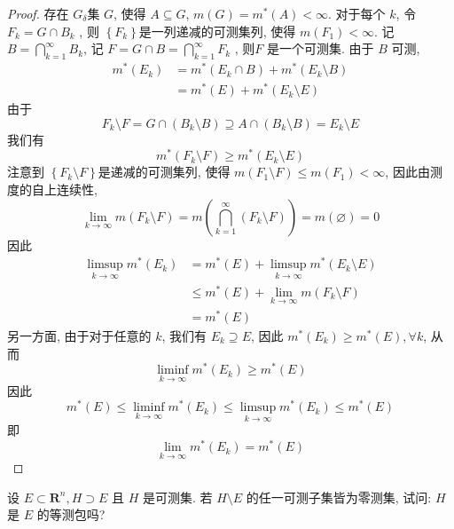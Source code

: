 \documentclass[../main.tex]{subfiles}
\begin{document}
\begin{proof}
存在 \(  G_{ \delta }  \)集 \(  G  \), 使得 \(  A\subseteq G  \), \(  m\left( G \right)= m^{*}\left( A \right)< \infty   \). 对于每个 \(  k  \), 令\(  F_{k}= G\cap B_{k}  \) , 则 \(  \left\{ F_{k} \right\}  \)是一列递减的可测集列, 使得 \(  m\left( F_1 \right)< \infty   \).     记 \(  B= \bigcap _{k= 1}^{\infty}B_{k}  \), 记 \(  F= G\cap B= \bigcap _{k= 1}^{\infty}F_{k}  \) , 则\(  F  \) 是一个可测集.   由于 \(    B\)  可测,    \[
\begin{aligned}
m^{*}\left( E_{k} \right)&= m^{*}\left( E_{k}\cap B \right)+ m^{*}\left( E_{k}\setminus B \right) \\ 
 &= m^{*}\left( E \right)+ m^{*}\left( E_{k}\setminus E \right)  
\end{aligned}   
\] 由于 \[
F_{k}\setminus F= G\cap \left( B_{k}\setminus B \right)\supseteq A\cap \left( B_{k}\setminus B \right)=  E_{k}\setminus E  
\]我们有\[m^{*}\left( F_{k}\setminus F \right)\ge m^{*}\left( E_{k}\setminus E \right)  
\]注意到 \(  \left\{ F_{k}\setminus F \right\}  \)是递减的可测集列, 使得 \(  m\left( F_1\setminus F \right)\le m\left( F_1 \right)< \infty    \),  因此由测度的自上连续性,  \[
\lim_{k\to \infty}m\left( F_{k}\setminus F \right)= m\left( \bigcap _{k= 1}^{\infty}\left( F_{k}\setminus F \right)  \right)= m\left( \varnothing \right)= 0   
\] 因此 \[\begin{aligned}
\limsup_{k\to \infty}m^{*}\left( E_{k} \right)&=  m^{*}\left( E \right)+ \limsup_{k\to \infty}m^{*}\left( E_{k}\setminus E\right)\\ 
 &   \le m^{*}\left( E \right)+ \lim_{k\to \infty}m\left( F_{k}\setminus F \right)  \\ 
  &= m^{*}\left( E \right)  
\end{aligned}
\]另一方面, 由于对于任意的 \(  k  \), 我们有 \(  E_{k}\supseteq E  \), 因此 \(  m^{*}\left( E_{k} \right)\ge m^{*}\left( E \right), \forall k    \), 从而 \[
\liminf_{k\to \infty}m^{*}\left( E_{k} \right)\ge m^{*}\left( E \right)  
\]   因此 \[
m^{*}\left( E \right)\le \liminf_{k\to \infty}m^{*}\left( E_{k} \right)\le \limsup_{k\to \infty}m^{*}\left( E_{k} \right)\le m^{*}\left( E \right)    
\]即 \[
\lim_{k\to \infty}m^{*}\left( E_{k} \right)= m^{*}\left( E \right)  
\]
\end{proof}
\begin{exercise}{}{}
设 $E \subset \mathbf{R}^n, H \supset E$ 且 $H$ 是可测集. 若 $H \setminus E$ 的任一可测子集皆为零测集, 试问: $H$ 是 $E$ 的等测包吗?
\end{exercise}
\end{document}

